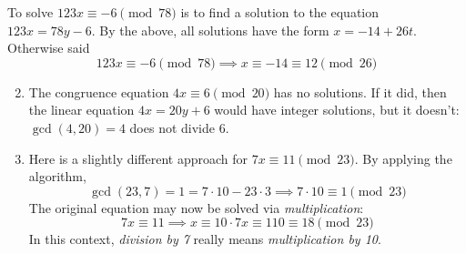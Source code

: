\begin{examples}{}{}
	\exstart To solve $123x\equiv -6\pmod{78}$ is to find a solution to the equation $123x=78y-6$. By the above, all solutions have the form $x=-14+26t$. Otherwise said
	\[123x\equiv -6\pmod{78} \implies x\equiv -14\equiv 12\pmod{26}\]
	
	\begin{enumerate}\setcounter{enumi}{1}
	  \item The congruence equation $4x\equiv 6\pmod{20}$ has no solutions. If it did, then the linear equation $4x=20y+6$ would have integer solutions, but it doesn't: $\gcd(4,20)=4$ does not divide 6. 
	  
	  \item Here is a slightly different approach for $7x\equiv 11\pmod{23}$. By applying the algorithm,
		\[
			\gcd(23,7)=1=7\cdot 10-23\cdot 3 \implies 7\cdot 10\equiv 1\pmod{23}
		\]
		The original equation may now be solved via \emph{multiplication}:
		\[
			7x\equiv 11 \implies x\equiv 10\cdot 7x\equiv 110\equiv 18\pmod{23}
		\]
		In this context, \emph{division by 7} really means \emph{multiplication\footnotemark{} by 10}.
	\end{enumerate}
\end{examples}




